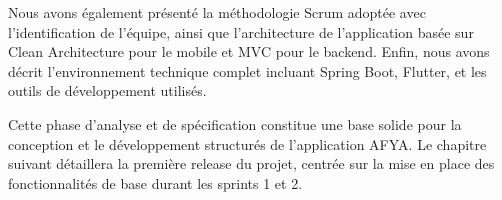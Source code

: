 Nous avons également présenté la méthodologie Scrum adoptée avec l'identification de l'équipe, ainsi que l'architecture de l'application basée sur Clean Architecture pour le mobile et MVC pour le backend. Enfin, nous avons décrit l'environnement technique complet incluant Spring Boot, Flutter, et les outils de développement utilisés.

Cette phase d'analyse et de spécification constitue une base solide pour la conception et le développement structurés de l'application AFYA. Le chapitre suivant détaillera la première release du projet, centrée sur la mise en place des fonctionnalités de base durant les sprints 1 et 2.
